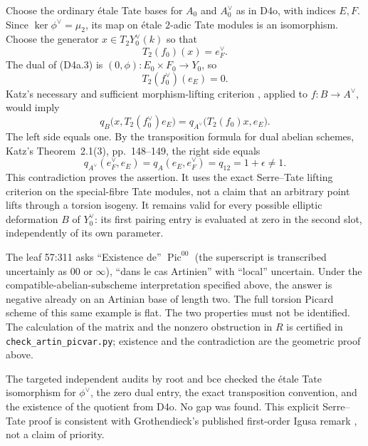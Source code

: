 Choose the ordinary étale Tate bases for $A_0$ and $A_0^\vee$
as in D4o, with indices $E,F$. Since $\ker\phi^\vee=\mu_2$,
its map on étale $2$-adic Tate modules is an isomorphism. Choose
the generator $x\in T_2Y_0^\vee(k)$ so that
\[
 T_2(f_0)(x)=e_F^\vee.
\]
The dual of (D4a.3) is $(0,\phi):E_0\times F_0\to Y_0$,
so
\[
 T_2(f_0^\vee)(e_E)=0.
\]
Katz's necessary and sufficient morphism-lifting criterion
\cite[Theorem 2.1(4), p.~149]{DGJ_Katz1981}, applied to
$f:B\to A^\vee$, would imply
\[
 q_B\bigl(x,T_2(f_0^\vee)e_E\bigr)
    =q_{A^\vee}\bigl(T_2(f_0)x,e_E\bigr).
\]
The left side equals one. By the transposition formula for dual
abelian schemes, Katz's Theorem~2.1(3), pp.~148--149, the right
side equals
\[
 q_{A^\vee}(e_F^\vee,e_E)=q_A(e_E,e_F^\vee)
      =q_{12}=1+\epsilon\ne1.
\]
This contradiction proves the assertion. It uses the exact
Serre--Tate lifting criterion on the special-fibre Tate modules,
not a claim that an arbitrary point lifts through a torsion
isogeny. It remains valid for every possible elliptic deformation
$B$ of $Y_0^\vee$: its first pairing entry is evaluated at zero
in the second slot, independently of its own parameter.

The leaf 57:311 asks ``Existence de'' $\operatorname{Pic}^{00}$
(the superscript is transcribed uncertainly as $00$ or $\infty$),
``dans le cas Artinien'' with ``local'' uncertain. Under the
compatible-abelian-subscheme interpretation specified above,
the answer is negative already on an Artinian base of length two. The full torsion Picard scheme
of this same example is flat. The two properties must not be
identified. The calculation of the matrix and the nonzero
obstruction in $R$ is certified in
\texttt{check\_artin\_picvar.py}; existence and the contradiction
are the geometric proof above.

The targeted independent audits by root and bce checked the étale Tate
isomorphism for $\phi^\vee$, the zero dual entry, the exact
transposition convention, and the existence of the quotient from
D4o. No gap was found. This explicit Serre--Tate proof is consistent
with Grothendieck's published first-order Igusa remark
\cite[Remark 3.4, p.~238]{DGJ_FGAVI1962}, not a claim of priority.
